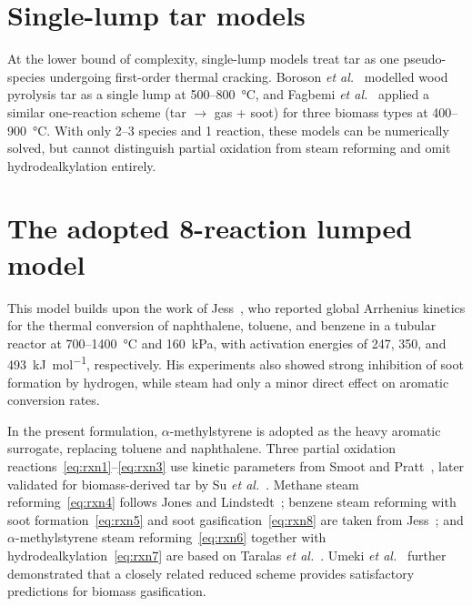 \section{Single-lump tar models}\label{sec:single_lump}

At the lower bound of complexity, single-lump models treat tar as one pseudo-species undergoing first-order thermal cracking. Boroson \textit{et al.}~\cite{Boroson1989} modelled wood pyrolysis tar as a single lump at 500--800~\si{\degreeCelsius}, and Fagbemi \textit{et al.}~\cite{Fagbemi2001} applied a similar one-reaction scheme (tar \(\to\) gas + soot) for three biomass types at 400--900~\si{\degreeCelsius}. With only 2--3 species and 1 reaction, these models can be numerically solved, but cannot distinguish partial oxidation from steam reforming and omit hydrodealkylation entirely.

\section{The adopted 8-reaction lumped model}\label{sec:adopted_model}

This model builds upon the work of Jess~\cite{Jess1996}, who reported global Arrhenius kinetics for the thermal conversion of naphthalene, toluene, and benzene in a tubular reactor at 700--1400~\si{\degreeCelsius} and \SI{160}{\kilo\pascal}, with activation energies of 247, 350, and \SI{493}{\kilo\joule\per\mole}, respectively. His experiments also showed strong inhibition of soot formation by hydrogen, while steam had only a minor direct effect on aromatic conversion rates.

In the present formulation, \(\alpha\)-methylstyrene is adopted as the heavy aromatic surrogate, replacing toluene and naphthalene. Three partial oxidation reactions~\eqref{eq:rxn1}--\eqref{eq:rxn3} use kinetic parameters from Smoot and Pratt~\cite{SmootPratt1979}, later validated for biomass-derived tar by Su \textit{et al.}~\cite{Su2011}. Methane steam reforming~\eqref{eq:rxn4} follows Jones and Lindstedt~\cite{JonesLindstedt1988}; benzene steam reforming with soot formation~\eqref{eq:rxn5} and soot gasification~\eqref{eq:rxn8} are taken from Jess~\cite{Jess1996}; and \(\alpha\)-methylstyrene steam reforming~\eqref{eq:rxn6} together with hydrodealkylation~\eqref{eq:rxn7} are based on Taralas \textit{et al.}~\cite{Taralas2003}. Umeki \textit{et al.}~\cite{Umeki2012} further demonstrated that a closely related reduced scheme provides satisfactory predictions for biomass gasification.

